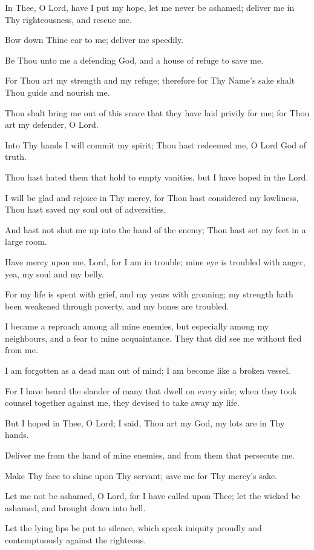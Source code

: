 In Thee, O Lord, have I put my hope, let me never be ashamed; deliver me in Thy righteousness, and rescue me.

Bow down Thine ear to me; deliver me speedily.

Be Thou unto me a defending God, and a house of refuge to save me.

For Thou art my strength and my refuge; therefore for Thy Name's sake shalt Thou guide and nourish me.

Thou shalt bring me out of this snare that they have laid privily for me; for Thou art my defender, O Lord.

Into Thy hands I will commit my spirit; Thou hast redeemed me, O Lord God of truth.

Thou hast hated them that hold to empty vanities, but I have hoped in the Lord.

I will be glad and rejoice in Thy mercy, for Thou hast considered my lowliness, Thou hast saved my soul out of adversities,

And hast not shut me up into the hand of the enemy; Thou hast set my feet in a large room.

Have mercy upon me, Lord, for I am in trouble; mine eye is troubled with anger, yea, my soul and my belly.

For my life is spent with grief, and my years with groaning; my strength hath been weakened through poverty, and my bones are
troubled.

I became a reproach among all mine enemies, but especially among my neighbours, and a fear to mine acquaintance. They that did see me without fled from me.

I am forgotten as a dead man out of mind; I am become like a broken vessel.

For I have heard the slander of many that dwell on every side; when they took counsel together against me, they devised to take away my life.

But I hoped in Thee, O Lord; I said, Thou art my God, my lots are in Thy hands.

Deliver me from the hand of mine enemies, and from them that persecute me.

Make Thy face to shine upon Thy servant; save me for Thy mercy’s sake.

Let me not be ashamed, O Lord, for I have called upon Thee; let the wicked be ashamed, and brought down into hell.

Let the lying lips be put to silence, which speak iniquity proudly and contemptuously against the righteous.

